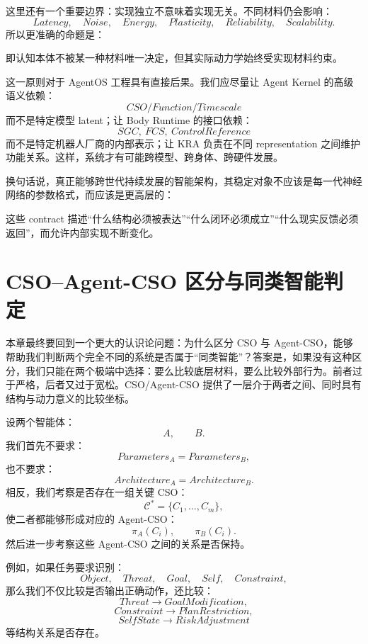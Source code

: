 这里还有一个重要边界：实现独立不意味着实现无关。不同材料仍会影响：
\[
Latency,
\quad
Noise,
\quad
Energy,
\quad
Plasticity,
\quad
Reliability,
\quad
Scalability.
\]
所以更准确的命题是：
\begin{statementbox}
\centering
{}
\end{statementbox}
即认知本体不被某一种材料唯一决定，但其实际动力学始终受实现材料约束。

这一原则对于 AgentOS 工程具有直接后果。我们应尽量让 Agent Kernel 的高级语义依赖：
\[
CSO/Function/Timescale
\]
而不是特定模型 latent；让 Body Runtime 的接口依赖：
\[
SGC,\ FCS,\ ControlReference
\]
而不是特定机器人厂商的内部表示；让 KRA 负责在不同 representation 之间维护功能关系。这样，系统才有可能跨模型、跨身体、跨硬件发展。

换句话说，真正能够跨世代持续发展的智能架构，其稳定对象不应该是每一代神经网络的参数格式，而应该是更高层的：
\begin{statementbox}
\centering
{}
\end{statementbox}
这些 contract 描述“什么结构必须被表达”“什么闭环必须成立”“什么现实反馈必须返回”，而允许内部实现不断变化。

\section{CSO--Agent-CSO 区分与同类智能判定}

本章最终要回到一个更大的认识论问题：为什么区分 CSO 与 Agent-CSO，能够帮助我们判断两个完全不同的系统是否属于“同类智能”？答案是，如果没有这种区分，我们只能在两个极端中选择：要么比较底层材料，要么比较外部行为。前者过于严格，后者又过于宽松。CSO/Agent-CSO 提供了一层介于两者之间、同时具有结构与动力意义的比较坐标。

设两个智能体：
\[
A,\qquad B.
\]
我们首先不要求：
\[
Parameters_A
=
Parameters_B,
\]
也不要求：
\[
Architecture_A
=
Architecture_B.
\]
相反，我们考察是否存在一组关键 CSO：
\[
\mathcal C^\ast
=
\{C_1,\ldots,C_m\},
\]
使二者都能够形成对应的 Agent-CSO：
\[
\pi_A(C_i),
\qquad
\pi_B(C_i).
\]
然后进一步考察这些 Agent-CSO 之间的关系是否保持。

例如，如果任务要求识别：
\[
Object,
\quad
Threat,
\quad
Goal,
\quad
Self,
\quad
Constraint,
\]
那么我们不仅比较是否输出正确动作，还比较：
\[
Threat
\rightarrow
GoalModification,
\]
\[
Constraint
\rightarrow
PlanRestriction,
\]
\[
SelfState
\rightarrow
RiskAdjustment
\]
等结构关系是否存在。

